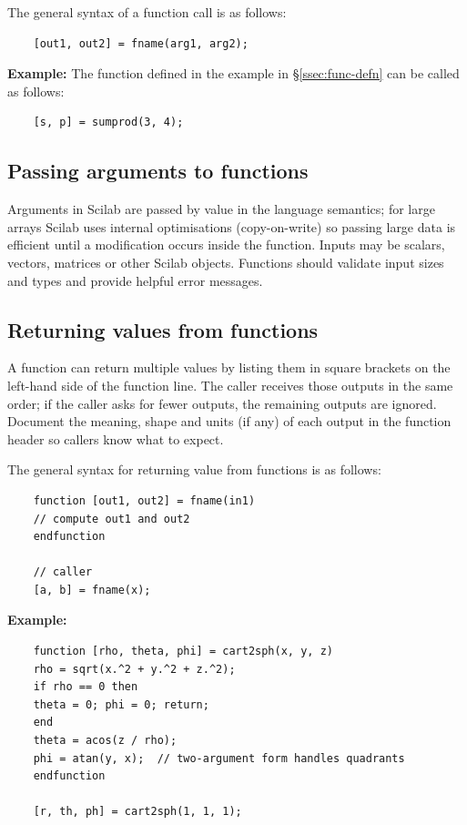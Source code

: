 		The general syntax of a function call is as follows:
		\begin{verbatim}
	[out1, out2] = fname(arg1, arg2);
		\end{verbatim}
		
		\textbf{Example:} The function defined in the example in \S \ref{ssec:func-defn} can be called as follows:
		\begin{verbatim}
	[s, p] = sumprod(3, 4);
		\end{verbatim}
	
	\subsection{Passing arguments to functions}
		Arguments in Scilab are passed by value in the language semantics; for large arrays Scilab uses internal optimisations (copy-on-write) so passing large data is efficient until a modification occurs inside the function. Inputs may be scalars, vectors, matrices or other Scilab objects. Functions should validate input sizes and types and provide helpful error messages.

	\subsection{Returning values from functions}
		A function can return multiple values by listing them in square brackets on the left-hand side of the function line. The caller receives those outputs in the same order; if the caller asks for fewer outputs, the remaining outputs are ignored. Document the meaning, shape and units (if any) of each output in the function header so callers know what to expect.
		
		The general syntax for returning value from functions is as follows:
		\begin{verbatim}
	function [out1, out2] = fname(in1)
	// compute out1 and out2
	endfunction
	
	// caller
	[a, b] = fname(x);
		\end{verbatim}
		
		\textbf{Example:} 
		\begin{verbatim}
	function [rho, theta, phi] = cart2sph(x, y, z)
	rho = sqrt(x.^2 + y.^2 + z.^2);
	if rho == 0 then
	theta = 0; phi = 0; return;
	end
	theta = acos(z / rho);
	phi = atan(y, x);  // two-argument form handles quadrants
	endfunction
	
	[r, th, ph] = cart2sph(1, 1, 1);
		\end{verbatim}

